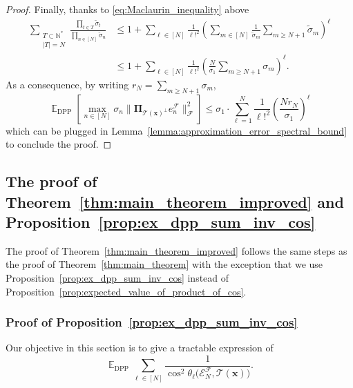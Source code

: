 \documentclass[twoside,11pt]{book}
\numberwithin{theorem}{chapter}
\numberwithin{definition}{chapter}
\numberwithin{proposition}{chapter}
\numberwithin{corollary}{chapter}
\numberwithin{example}{chapter}
\numberwithin{lemma}{chapter}
\numberwithin{assumption}{chapter}
\numberwithin{equation}{chapter}
\numberwithin{figure}{chapter}
\DeclareMathOperator{\DPP}{\mathrm{DPP}}
\DeclareMathOperator{\EX}{\mathbb{E}}
\begin{document}
\begin{proof}
%
Finally, thanks to \eqref{eq:Maclaurin_inequality} above
\begin{align}
  \sum\limits_{\substack{T \subset \mathbb{N}^{*} \\ |T| = N}} \frac{ \prod\limits_{t \in T}\tilde{\sigma}_{t}}{\prod\limits_{n \in [N]} \tilde{\sigma}_{n}}
  & \leq  1 + \sum\limits_{\ell \in [N]} \frac{1}{\ell!^{2}} \left(\sum\limits_{m \in [N]}\frac{1}{\tilde{\sigma}_{m}} \sum\limits_{m \geq N+1} \tilde{\sigma}_{m}\right)^{\ell} \\
  & \leq 1+ \sum\limits_{\ell \in [N]} \frac{1}{\ell!^{2}} \left(\frac{N}{\sigma_1} \sum\limits_{m \geq N+1} \sigma_{m}\right)^{\ell} \nonumber.
\end{align}
%
As a consequence, by writing $r_{N} = \sum\limits_{m \geq N+1} \sigma_{m}$,
\begin{equation}
  \EX_{\DPP} \left[ \max_{ n \in [N]}\sigma_n \|\bm{\Pi}_{\mathcal{T}(\bm{x})^{\perp}} e_{n}^{\mathcal{F}}\|_{\mathcal{F}}^{2} \right]
  \leq
  \sigma_1 \cdot \sum_{\ell=1}^{N} \frac{1}{\ell!^{2}} \left(\frac{N  r_{N} }{\sigma_1}\right)^{\ell}
\end{equation}
which can be plugged in Lemma~\ref{lemma:approximation_error_spectral_bound} to conclude the proof.
\end{proof}


\subsection{The proof of Theorem~\ref{thm:main_theorem_improved} and Proposition~\ref{prop:ex_dpp_sum_inv_cos}}\label{sec:dppkq_last_proof}

The proof of Theorem~\ref{thm:main_theorem_improved} follows the same steps as the proof of Theorem~\ref{thm:main_theorem} with the exception that we use Proposition~\ref{prop:ex_dpp_sum_inv_cos} instead of Proposition~\ref{prop:expected_value_of_product_of_cos}.


\subsubsection{Proof of Proposition~\ref{prop:ex_dpp_sum_inv_cos}}
Our objective in this section is to give a tractable expression of 
\begin{equation}
\EX_{\DPP} \sum\limits_{\ell \in [N]} \frac{1}{\cos^{2} \theta_{\ell} \bigg(\mathcal{E}^{\mathcal{F}}_{N}, \mathcal{T}(\bm{x}) \bigg)}.
\end{equation}
\end{document}

